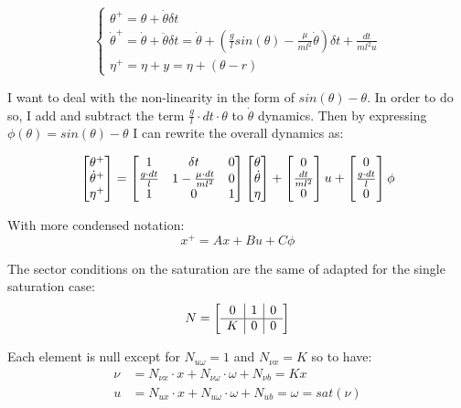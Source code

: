 \documentclass{article}
\begin{document}
$$
  \begin{cases}
    \theta^{+} = \theta + \dot{\theta} \delta t\\
    \dot{\theta}^{+} = \dot{\theta} + \ddot{\theta} \delta t = \dot{\theta} + (\frac{g}{l} sin(\theta) - \frac{\mu}{m l^{2}} \dot{\theta}) \delta t + \frac{dt}{m l^{2} u} \\
    \eta^{+} = \eta + y = \eta + (\theta - r)
  \end{cases}
$$

I want to deal with the non-linearity in the form of $sin(\theta) - \theta$. In order to do so, I add and subtract the term $\frac{g}{l} \cdot dt \cdot \theta$ to $\dot{\theta}$ dynamics. Then by expressing $\phi(\theta) = sin(\theta) - \theta$ I can rewrite the overall dynamics as:

\begin{equation}
  \left[\begin{matrix}
    \theta^{+} \\
    \dot{\theta}^{+} \\
    \eta^{+}
  \end{matrix}\right] = \left[\begin{matrix}
    1 & \delta t & 0 \\
    \frac{g \cdot dt}{l} & 1 - \frac{\mu \cdot dt}{m l^{2}} & 0 \\
    1 & 0 & 1
  \end{matrix}\right] \left[\begin{matrix}
    \theta \\
    \dot{\theta} \\
    \eta
  \end{matrix}\right] + \left[\begin{matrix}
    0 \\
    \frac{dt}{m l^{2}} \\
    0
  \end{matrix}\right] u + \left[\begin{matrix}
    0 \\
    \frac{g \cdot dt}{l} \\
    0 
  \end{matrix}\right] \phi 
\end{equation}

With more condensed notation:
$$
  x^{+} = A x + B u + C \phi
$$

The sector conditions on the saturation are the same of \cite{css-extended} adapted for the single saturation case:
$$
N = \left[\begin{matrix}
\begin{array}{c|c|c}
  0 & 1 & 0 \\
  \hline
  K & 0 & 0
\end{array}
\end{matrix}\right]
$$

Each element is null except for $N_{u \omega} = 1$ and $N_{\nu x} = K$ so to have:
\begin{align*}
  \nu &= N_{\nu x} \cdot x + N_{\nu \omega} \cdot \omega + N_{\nu b} = K x\\
  u &= N_{ux} \cdot x + N_{u \omega} \cdot \omega + N_{u b} = \omega = sat(\nu)
\end{align*}
\end{document}
